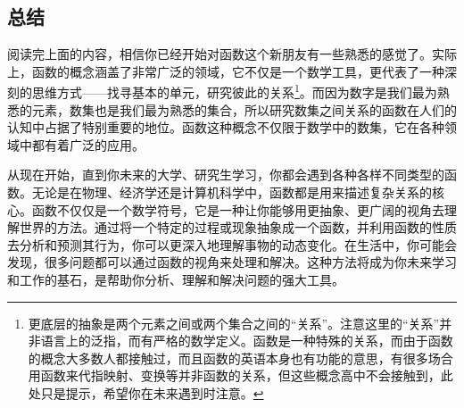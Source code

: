 \subsection{总结}

阅读完上面的内容，相信你已经开始对函数这个新朋友有一些熟悉的感觉了。实际上，函数的概念涵盖了非常广泛的领域，它不仅是一个数学工具，更代表了一种深刻的思维方式——找寻基本的单元，研究彼此的关系\footnote{更底层的抽象是两个元素之间或两个集合之间的“关系”。注意这里的“关系”并非语言上的泛指，而有严格的数学定义。函数是一种特殊的关系，而由于函数的概念大多数人都接触过，而且函数的英语本身也有功能的意思，有很多场合用函数来代指映射、变换等并非函数的关系，但这些概念高中不会接触到，此处只是提示，希望你在未来遇到时注意。}。而因为数字是我们最为熟悉的元素，数集也是我们最为熟悉的集合，所以研究数集之间关系的函数在人们的认知中占据了特别重要的地位。函数这种概念不仅限于数学中的数集，它在各种领域中都有着广泛的应用。

从现在开始，直到你未来的大学、研究生学习，你都会遇到各种各样不同类型的函数。无论是在物理、经济学还是计算机科学中，函数都是用来描述复杂关系的核心。函数不仅仅是一个数学符号，它是一种让你能够用更抽象、更广阔的视角去理解世界的方法。通过将一个特定的过程或现象抽象成一个函数，并利用函数的性质去分析和预测其行为，你可以更深入地理解事物的动态变化。在生活中，你可能会发现，很多问题都可以通过函数的视角来处理和解决。这种方法将成为你未来学习和工作的基石，是帮助你分析、理解和解决问题的强大工具。
